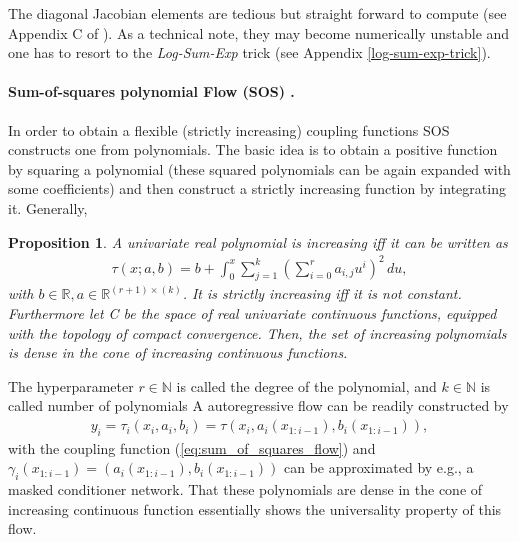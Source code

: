 \documentclass[12pt,a4paper]{article}
\newtheorem{proposition}{Proposition}
\begin{document}
The diagonal Jacobian elements are tedious but straight forward to compute (see Appendix C of \cite{huang_2018_neural_autoregressive_flows}). As a technical note,  they  may become numerically unstable and one has to resort to the \textit{Log-Sum-Exp} trick (see Appendix \ref{log-sum-exp-trick}).


\paragraph{Sum-of-squares polynomial Flow (SOS) \cite{jaini_polynomial_flow_2019}.}
In order to obtain a flexible (strictly increasing) coupling functions  SOS constructs  one from polynomials. The basic idea is to obtain a positive function by squaring a polynomial (these squared polynomials can be again expanded with some coefficients) and then construct a strictly increasing function by integrating it. Generally,
\begin{proposition}{\cite{jaini_polynomial_flow_2019}}
	A univariate real polynomial is increasing iff it can be written as
	\begin{align}\label{eq:sum_of_squares_flow}
		\tau (x; a, b) = b + \int_0^x\sum_{j=1}^k \left(\sum_{i=0}^r a_{i, j} u^i \right) ^2 \, du,
	\end{align}
	with $b\in \mathbb{R},  a\in\mathbb{R}^{(r+1)\times (k)}$. It is strictly increasing iff it is not constant.
	Furthermore let C be the space of real univariate continuous functions, equipped with the topology of compact convergence. Then, the set of increasing polynomials is dense
	in the cone of increasing continuous functions.
\end{proposition}
The hyperparameter $r\in \mathbb{N}$ is called the degree of the polynomial, and $k\in \mathbb{N}$  is called number of polynomials
A autoregressive flow can be readily constructed by
\begin{align}
	y_i = \tau_i(x_i, a_i, b_i) = \tau(x_i, a_i(x_{1:i-1}), b_i(x_{1:i-1})), 
\end{align}
with the coupling function (\ref{eq:sum_of_squares_flow}) and 
$\gamma_i(x_{1:i-1}) = (a_i(x_{1:i-1}), b_i(x_{1:i-1}))$ can be approximated by e.g., a masked conditioner network. 
That these polynomials are dense in the cone of increasing continuous function essentially shows the universality property of this flow. 
\end{document}
